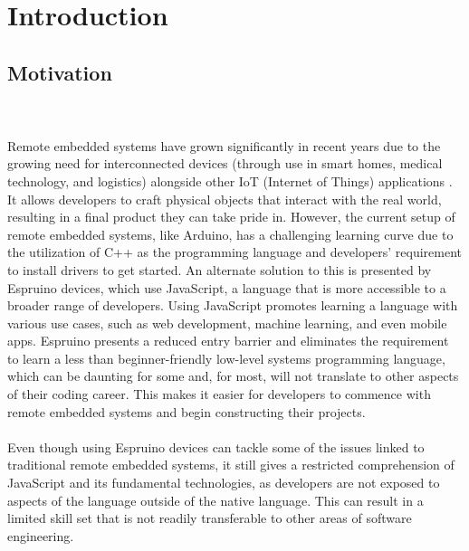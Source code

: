 \documentclass{l4proj}
\begin{document}
\educationalconsent

\tableofcontents
\listoffigures

\chapter{Introduction}



\section{Motivation} %

\text 
\\ \\
Remote embedded systems have grown significantly in recent years due to the growing need for interconnected devices (through use in smart homes, medical technology, and logistics) alongside other IoT (Internet of Things) applications \cite{embedded-boom}. It allows developers to craft physical objects that interact with the real world, resulting in a final product they can take pride in. However, the current setup of remote embedded systems, like Arduino, has a challenging learning curve due to the utilization of C++ as the programming language and developers' requirement to install drivers to get started.
An alternate solution to this is presented by Espruino devices, which use JavaScript, a language that is more accessible to a broader range of developers. Using JavaScript promotes learning a language with various use cases, such as web development, machine learning, and even mobile apps. Espruino presents a reduced entry barrier and eliminates the requirement to learn a less than beginner-friendly low-level systems programming language, which can be daunting for some and, for most, will not translate to other aspects of their coding career. This makes it easier for developers to commence with remote embedded systems and begin constructing their projects.
\\ \\
Even though using Espruino devices can tackle some of the issues linked to traditional remote embedded systems, it still gives a restricted comprehension of JavaScript and its fundamental technologies, as developers are not exposed to aspects of the language outside of the native language. This can result in a limited skill set that is not readily transferable to other areas of software engineering.
\\ \\
\end{document}
